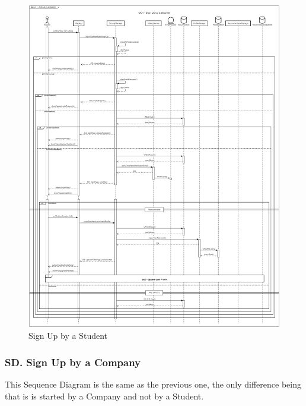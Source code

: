 \begin{figure}[H]
    \begin{center}
         \includegraphics[width=1\linewidth]{LaTeXCode/images/SequenceDiagrams/UC1-sequenceDiagram.png}
         \caption{Sign Up by a Student}
         \label{fig:signup_student_sd}
     \end{center}
\end{figure}

\newpage

\subsubsection*{SD\cuc. Sign Up by a Company}
\label{subsubsec:signup_company_sd}
This Sequence Diagram is the same as the previous one, the only difference being that is is started by a Company and not by a Student.

